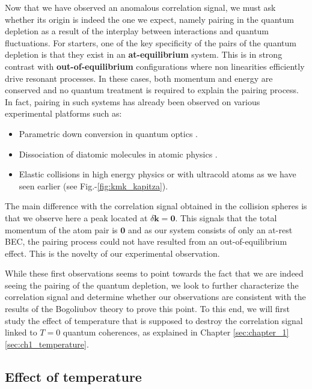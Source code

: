 Now that we have observed an anomalous correlation signal, we must ask whether its origin is indeed the one we expect, namely \kmk pairing in the quantum depletion as a result of the interplay between interactions and quantum fluctuations. For starters, one of the key specificity of the \kmk pairs of the quantum depletion is that they exist in an \textbf{at-equilibrium} system. This is in strong contrast with \textbf{out-of-equilibrium} configurations where non linearities efficiently drive resonant processes. In these cases, both momentum and energy are conserved and no quantum treatment is required to explain the pairing process. In fact, \kmk pairing in such systems has already been observed on various experimental platforms such as:

\begin{itemize}
    \item Parametric down conversion in quantum optics \cite{burnham1970}.
    \item Dissociation of diatomic molecules in atomic physics \cite{greiner2005}.
    \item Elastic collisions in high energy physics \cite{arnison1982} or with ultracold atoms \cite{perrin2007observation} as we have seen earlier (see Fig.-\ref{fig:kmk_kapitza}).
\end{itemize}

The main difference with the \kmk correlation signal obtained in the collision spheres is that we observe here a peak located at $\delta \bm{k} = \bm{0}$. This signals that the total momentum of the atom pair is $\bm{0}$ and as our system consists of only an at-rest BEC, the pairing process could not have resulted from an out-of-equilibrium effect. This is the novelty of our experimental observation.

While these first observations seems to point towards the fact that we are indeed seeing the \kmk pairing of the quantum depletion, we look to further characterize the correlation signal and determine whether our observations are consistent with the results of the Bogoliubov theory to prove this point. To this end, we will first study the effect of temperature that is supposed to destroy the \kmk correlation signal linked to $T=0$ quantum coherences, as explained in Chapter \ref{sec:chapter_1} \ref{sec:ch1_temperature}.





\subsection{Effect of temperature}

